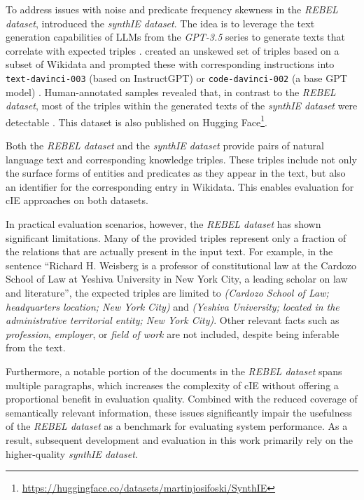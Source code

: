 \documentclass[a4paper,oneside,bibliography=totoc]{scrbook}
\begin{document}
To address issues with noise and predicate frequency skewness in the \textit{REBEL dataset}, \citet{Josifoski2023} introduced the \textit{synthIE dataset}. The idea is to leverage the text generation capabilities of \acp{LLM} from the \textit{GPT-3.5} series to generate texts that correlate with expected triples \cite{Josifoski2023}. \citet{Josifoski2023} created an unskewed set of triples based on a subset of Wikidata and prompted these with corresponding instructions into \texttt{text-davinci-003} (based on InstructGPT) or \texttt{code-davinci-002} (a base GPT model) \cite{Josifoski2023,OpenAI2025a}. Human-annotated samples revealed that, in contrast to the \textit{REBEL dataset}, most of the triples within the generated texts of the \textit{synthIE dataset} were detectable \cite{Josifoski2023}. This dataset is also published on Hugging Face\footnote{\url{https://huggingface.co/datasets/martinjosifoski/SynthIE}}.

Both the \textit{REBEL dataset} and the \textit{synthIE dataset} provide pairs of natural language text and corresponding knowledge triples. These triples include not only the surface forms of entities and predicates as they appear in the text, but also an identifier for the corresponding entry in Wikidata. This enables evaluation for \ac{cIE} approaches on both datasets.

In practical evaluation scenarios, however, the \textit{REBEL dataset} has shown significant limitations. Many of the provided triples represent only a fraction of the relations that are actually present in the input text. For example, in the sentence \enquote{Richard H. Weisberg is a professor of constitutional law at the Cardozo School of Law at Yeshiva University in New York City, a leading scholar on law and literature}, the expected triples are limited to \textit{(Cardozo School of Law; headquarters location; New York City)} and \textit{(Yeshiva University; located in the administrative territorial entity; New York City)}. Other relevant facts such as \textit{profession}, \textit{employer}, or \textit{field of work} are not included, despite being inferable from the text.

Furthermore, a notable portion of the documents in the \textit{REBEL dataset} spans multiple paragraphs, which increases the complexity of \ac{cIE} without offering a proportional benefit in evaluation quality. Combined with the reduced coverage of semantically relevant information, these issues significantly impair the usefulness of the \textit{REBEL dataset} as a benchmark for evaluating system performance. As a result, subsequent development and evaluation in this work primarily rely on the higher-quality \textit{synthIE dataset}.
\end{document}
